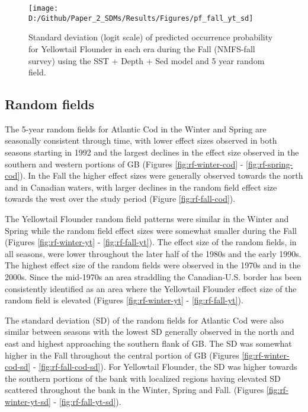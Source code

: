 \documentclass[
]{article}
\begin{document}
\begin{landscape}
\newpage
\begin{figure}
\texttt{[image: D:/Github/Paper\_2\_SDMs/Results/Figures/pf\_fall\_yt\_sd]} \caption{Standard deviation (logit scale) of predicted occurrence probability for Yellowtail Flounder in each era during the Fall (NMFS-fall survey) using the SST + Depth + Sed  model and 5 year random field.}\label{fig:pf-fall-yt-sd}
\end{figure}
\end{landscape}

\clearpage

\hypertarget{random-fields}{%
\subsection{Random fields}\label{random-fields}}

The 5-year random fields for Atlantic Cod in the Winter and Spring are seasonally consistent through time, with lower effect sizes observed in both seasons starting in 1992 and the largest declines in the effect size observed in the southern and western portions of GB (Figures \ref{fig:rf-winter-cod} - \ref{fig:rf-spring-cod}). In the Fall the higher effect sizes were generally observed towards the north and in Canadian waters, with larger declines in the random field effect size towards the west over the study period (Figure \ref{fig:rf-fall-cod}).

The Yellowtail Flounder random field patterns were similar in the Winter and Spring while the random field effect sizes were somewhat smaller during the Fall (Figures \ref{fig:rf-winter-yt} - \ref{fig:rf-fall-yt}). The effect size of the random fields, in all seasons, were lower throughout the later half of the 1980s and the early 1990s. The highest effect size of the random fields were observed in the 1970s and in the 2000s. Since the mid-1970s an area straddling the Canadian-U.S. border has been consistently identified as an area where the Yellowtail Flounder effect size of the random field is elevated (Figures \ref{fig:rf-winter-yt} - \ref{fig:rf-fall-yt}).

The standard deviation (SD) of the random fields for Atlantic Cod were also similar between seasons with the lowest SD generally observed in the north and east and highest approaching the southern flank of GB. The SD was somewhat higher in the Fall throughout the central portion of GB (Figures \ref{fig:rf-winter-cod-sd} - \ref{fig:rf-fall-cod-sd}). For Yellowtail Flounder, the SD was higher towards the southern portions of the bank with localized regions having elevated SD scattered throughout the bank in the Winter, Spring and Fall. (Figures \ref{fig:rf-winter-yt-sd} - \ref{fig:rf-fall-yt-sd}).
\end{document}
